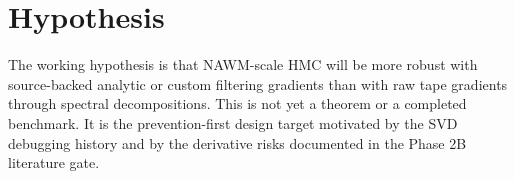\section{Hypothesis}
\label{sec:bf-nawm-hypothesis}

The working hypothesis is that NAWM-scale HMC will be more robust with
source-backed analytic or custom filtering gradients than with raw tape
gradients through spectral decompositions.  This is not yet a theorem or a
completed benchmark.  It is the prevention-first design target motivated by the
SVD debugging history and by the derivative risks documented in the Phase 2B
literature gate.
